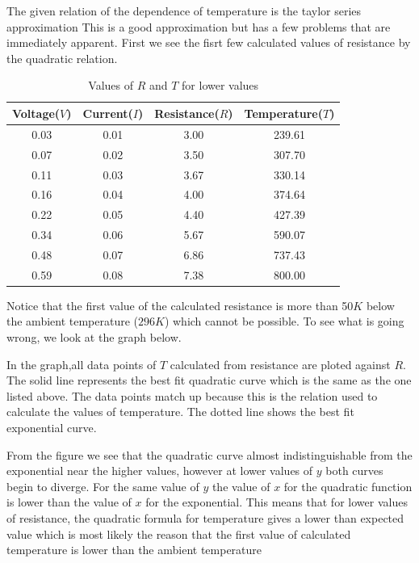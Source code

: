 \documentclass[12pt]{article}
\newlength\fwidth
\newlength\fheight
\begin{document}
The given relation of the dependence of temperature is the taylor series approximation
This is a good approximation but has a few problems that are immediately apparent.
First we see the fisrt few calculated values of resistance by the quadratic relation.
\begin{table}[!hbt]
    \centering
    \begin{tabular}{|c|c|c|c|}
    \hline
        Voltage($V$) & Current($I$) & Resistance($R$) & Temperature($T$) \\ \hline
        0.03 & 0.01 & 3.00 & 239.61 \\ \hline
        0.07 & 0.02 & 3.50 & 307.70 \\ \hline
        0.11 & 0.03 & 3.67 & 330.14 \\ \hline
        0.16 & 0.04 & 4.00 & 374.64 \\ \hline
        0.22 & 0.05 & 4.40 & 427.39 \\ \hline
        0.34 & 0.06 & 5.67 & 590.07 \\ \hline
        0.48 & 0.07 & 6.86 & 737.43 \\ \hline
        0.59 & 0.08 & 7.38 & 800.00 \\ \hline
    \end{tabular}
    \caption{Values of $R$ and $T$ for lower values}
\end{table}

Notice that the first value of the calculated resistance is more than 50$K$ below the ambient temperature ($296K$) which cannot be possible.
To see what is going wrong, we look at the graph below.
\begin{figure}[!ht]
    \centering
    \setlength{}
    \setlength{}
    
\end{figure}

In the graph,all data points of $T$ calculated from resistance are ploted against $R$.
The solid line represents the best fit quadratic curve which is the same as the one listed above.
The data points match up because this is the relation used to calculate the values of temperature.
The dotted line shows the best fit exponential curve.

From the figure we see that the quadratic curve almost indistinguishable from the exponential near the higher values,
however at lower values of $y$ both curves begin to diverge.
For the same value of $y$ the value of $x$ for the quadratic function is lower than the value of $x$ for the exponential.
This means that for lower values of resistance, the quadratic formula for temperature gives a lower than expected value
which is most likely the reason that the first value of calculated temperature is lower than the ambient temperature
\end{document}

